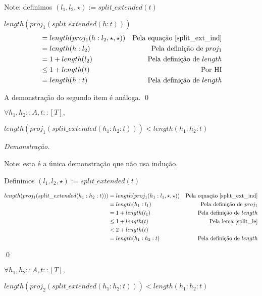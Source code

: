 \documentclass[12pt, oneside, a4paper,english,brazil]{abntex2}
\begin{document}
Note: definimos $(l_{1}, l_{2}, \star) := split\_extended(t)$


$length(proj_{1}(split\_extended(h : t)))$
\begin{align*}
  &= length(proj_{1}(h : l_{2}, \star, \star)) &\text{Pela equa\c{c}\~ao \ref{split_ext_ind}} \\
  &= length(h : l_{2}) &\text{Pela defini\c{c}\~ao de $proj_{1}$}\\
  &= 1 + length(l_{2}) &\text{Pela defini\c{c}\~ao de $length$}\\
  &\le 1 + length(t) &\text{Por HI}\\
  &= length(h : t) &\text{Pela defini\c{c}\~ao de $length$}
\end{align*}

A demonstra\c{c}\~ao do segundo item \'e an\'aloga.
\qed

\begin{lema} \label{split_lt}
  $\forall h_{1}, h_{2} :: A, t :: [T],$

  \qquad $length(proj_{1}(split\_extended(h_{1} : h_{2} : t))) < length(h_{1} : h_{2} : t)$
\end{lema}

\noindent \textit{Demonstra\c{c}\~ao.}

Note: esta \'e a \'unica demonstra\c{c}\~ao que n\~ao usa indu\c{c}\~ao.

Definimos $(l_{1}, l_{2}, \star) := split\_extended(t)$

\begin{align*}
  length(proj_{1}(split\_extended(h_{1} : h_{2} : t))) &= length(proj_{1}(h_{1} : l_{1}, \star, \star)) &\text{Pela equa\c{c}\~ao \ref{split_ext_ind}}\\
                                                       &= length(h_{1} : l_{1}) &\text{Pela defini\c{c}\~ao de $proj_{1}$}\\
                                                       &= 1 + length(l_{1}) &\text{Pela defini\c{c}\~ao de $length$}\\
                                                       &\le 1 + length(t) &\text{Pela lema \ref{split_le}}\\
                                                       &< 2 + length(t)\\
  &= length(h_{1} : h_{2} : t) &\text{Pela defini\c{c}\~ao de $length$}
\end{align*}

\qed

\begin{lema}
  $\forall h_{1}, h_{2} :: A, t :: [T],$

  \qquad $length(proj_{2}(split\_extended(h_{1} : h_{2} : t))) < length(h_{1} : h_{2} : t)$
\end{lema}
\end{document}
